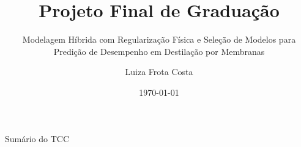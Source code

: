 \documentclass[handout,10pt,aspectratio=169]{beamer}
\title[V-AGMD Hybrid Modeling]
{     
     \textbf{Projeto Final de Graduação}
}
\subtitle[]
{
    Modelagem Híbrida com Regularização Física e Seleção de Modelos para Predição de Desempenho em Destilação por Membranas
}
\author{Luiza Frota Costa}
\institute{Universidade Federal do Rio de Janeiro}
\date{\today}
\begin{document}
\maketitle

\begin{slide}{Sumário do TCC}
  \vfill
  \tableofcontents
  \vfill
\end{slide}

    	
    	
    	
    	
    	
    	

\end{document}

